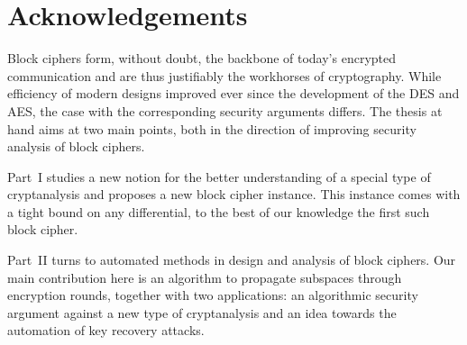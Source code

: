 \chapter*{Acknowledgements}

Block ciphers form, without doubt, the backbone of today's encrypted communication and are thus justifiably the workhorses of cryptography.
While efficiency of modern designs improved ever since the development of the DES and AES, the case with the corresponding security arguments differs.
The thesis at hand aims at two main points, both in the direction of improving security analysis of block ciphers.

Part~I studies a new notion for the better understanding of a special type of cryptanalysis and proposes a new block cipher instance.
This instance comes with a tight bound on any differential, to the best of our knowledge the first such block cipher.

Part~II turns to automated methods in design and analysis of block ciphers.
Our main contribution here is an algorithm to propagate subspaces through encryption rounds, together with two applications: an algorithmic security argument against a new type of cryptanalysis and an idea towards the automation of key recovery attacks.
